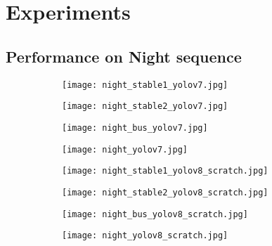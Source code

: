 \chapter{Experiments}  \label{chap:six}%

\section{Performance on Night sequence} \label{sec:night_sequence}

\begin{table}[htb]%
	\begin{subfigure}{\textwidth}
		\centering
		\begin{subfigure}{0.245\textwidth}
			\texttt{[image: night\_stable1\_yolov7.jpg]}
		\end{subfigure}\hfill
		\begin{subfigure}{0.245\textwidth}
			\texttt{[image: night\_stable2\_yolov7.jpg]}
		\end{subfigure}\hfill
		\begin{subfigure}{0.245\textwidth}
			\texttt{[image: night\_bus\_yolov7.jpg]}
		\end{subfigure}\hfill
		\begin{subfigure}{0.245\textwidth}
			\texttt{[image: night\_yolov7.jpg]}
		\end{subfigure}
	\end{subfigure}
	
	\begin{subfigure}{\textwidth}
		\centering
		\begin{subfigure}{0.245\textwidth}
			\texttt{[image: night\_stable1\_yolov8\_scratch.jpg]}
		\end{subfigure}\hfill
		\begin{subfigure}{0.245\textwidth}
			\texttt{[image: night\_stable2\_yolov8\_scratch.jpg]}
		\end{subfigure}\hfill
		\begin{subfigure}{0.245\textwidth}
			\texttt{[image: night\_bus\_yolov8\_scratch.jpg]}
		\end{subfigure}\hfill
		\begin{subfigure}{0.245\textwidth}
			\texttt{[image: night\_yolov8\_scratch.jpg]}
		\end{subfigure}
	\end{subfigure}
	

\end{table}
